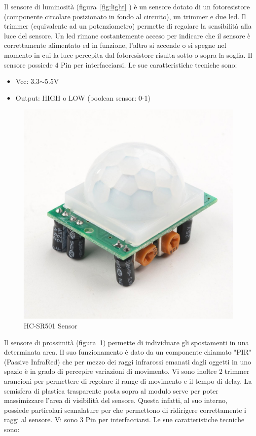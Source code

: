 Il sensore di luminosità (figura~\ref{fig:light} ) è un sensore dotato di un fotoresistore (componente circolare posizionato in fondo al circuito), un trimmer e due led. Il trimmer (equivalente ad un potenziometro) permette di regolare la sensibilità alla luce del sensore. Un led rimane costantemente acceso per indicare che il sensore è correttamente alimentato ed in funzione, l'altro si accende o si spegne nel momento in cui la luce percepita dal fotoresistore risulta sotto o sopra la soglia. Il sensore possiede 4 Pin per interfacciarsi.
Le sue caratteristiche tecniche sono:

\begin{itemize}
	\item Vcc: 3.3$\sim$5.5V
	\item Output: HIGH o LOW (boolean sensor: 0-1)
\end{itemize}

\newpage



\begin{figure}
	\centering
	\includegraphics[width=0.7\linewidth]{Figures/Sensors&Rasp/pir}
	\caption[PIR] {HC-SR501 Sensor}
	\label{fig:pir}

\end{figure}



Il sensore di prossimità (figura~\ref{fig:pir}) permette di individuare gli spostamenti in una determinata area. Il suo funzionamento è dato da un componente chiamato "PIR" (Passive InfraRed) che per mezzo dei raggi infrarossi emanati dagli oggetti in uno spazio è in grado di percepire variazioni di movimento. Vi sono inoltre 2 trimmer arancioni per permettere di regolare il range di movimento e il tempo di delay. La semisfera di plastica trasparente posta sopra al modulo serve per poter massimizzare l'area di visibilità del sensore. Questa infatti, al suo interno, possiede particolari scanalature per che permettono di ridirigere correttamente i raggi al sensore. Vi sono 3 Pin per interfacciarsi.
Le sue caratteristiche tecniche sono:

